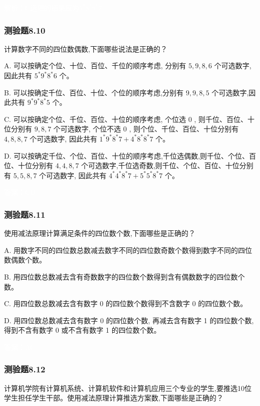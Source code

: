 \documentclass[UTF8, heading=true]{ctexart}
\begin{document}
\textcolor{white}{解析：C选项的结果应为$5^* 8 ^* 8 ^* 7$}

\subsubsection{测验题8.10}

计算数字不同的四位数偶数,下面哪些说法是正确的？

A. 可以按确定个位、十位、百位、千位的顺序考虑, 分别有 $5,9,8,6$ 个可选数字, 因此共有 $5^* 9^* 8^* 6$ 个。

B. 可以按确定千位、百位、十位、个位的顺序考虑,分别有 $9,9,8,5$ 个可选数字,因此共有 $9^* 9^* 8^* 5$ 个。

C. 可以按确定个位、千位、百位、十位的顺序考虑, 个位选 0 , 则千位、百位、十位分别有 $9,8,7$ 个可选数字, 个位不选 0 , 则个位、千位、百位、十位分别有 $4,8,8,7$ 个可选数字, 因此共有 $1 ^* 9^* 8^* 7+4^* 8^* 8^* 7$ 个。

D. 可以按确定千位、个位、百位、十位的顺序考虑,千位选偶数,则千位、个位、百位、十位分别有 $4,4,8,7$ 个可选数字,千位选奇数,则千位、个位、百位、十位分别有 $5,5,8,7$ 个可选数字, 因此共有 $4^* 4^* 8^* 7+5^* 5^* 8^* 7$ 个。

\textcolor{white}{答案：CD}

\subsubsection{测验题8.11}

使用减法原理计算满足条件的四位数个数,下面哪些是正确的？

A. 用数字不同的四位数总数减去数字不同的四位数奇数个数得到数字不同的四位数偶数个数。

B. 用四位数总数减去含有奇数数字的四位数个数得到含有偶数数字的四位数个数。

C. 用四位数总数减去含有数字 0 的四位数个数得到不含数字 0 的四位数个数。

D. 用四位数总数减去含有数字 0 的四位数个数, 再减去含有数字 1 的四位数个数, 得到不含有数字 0 或不含有数字 1 的四位数个数。

\textcolor{white}{答案：AC}

\subsubsection{测验题8.12}

计算机学院有计算机系统、计算机软件和计算机应用三个专业的学生,要推选10位学生担任学生干部。使用减法原理计算推选方案数,下面哪些是正确的？
\end{document}
